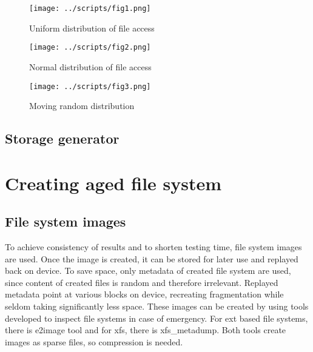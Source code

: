 \documentclass[
  color, %
  table, %
  lof,   %
  lot,   %
]{fithesis3}
\begin{document}
\begin{figure}[!htb]
    \centering
    \begin{minipage}{\textwidth}
        \centering
        \texttt{[image: ../scripts/fig1.png]}
        \caption{Uniform distribution of file access}
\label{fig:rand1}
    \end{minipage}\hfill
    \begin{minipage}{\textwidth}
        \centering
        \texttt{[image: ../scripts/fig2.png]}
        \caption{Normal distribution of file access}

\label{fig:rand2}
    \end{minipage}

\end{figure}
\begin{figure}
    \begin{minipage}{\textwidth}
        \centering
        \texttt{[image: ../scripts/fig3.png]}
        \caption{Moving random distribution}
\label{fig:rand3}
    \end{minipage}
\end{figure}

\section{Storage generator}

\chapter{Creating aged file system}

\section{File system images}
To achieve consistency of results and to shorten testing time, file system images are used. Once the image is created, it can be stored for later use and replayed back on device. To save space, only metadata of created file system are used, since content of created files is random and therefore irrelevant. Replayed metadata point at various blocks on device, recreating fragmentation while seldom taking significantly less space. These images can be created by using tools developed to inspect file systems in case of emergency. For ext based file systems, there is e2image tool and for xfs, there is xfs\_metadump. Both tools create images as sparse files, so compression is needed.
\end{document}
